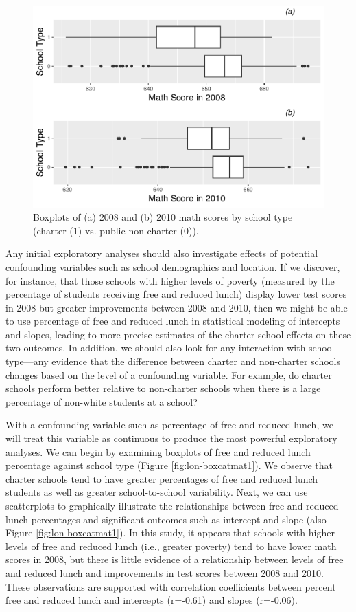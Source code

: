 \documentclass[
]{krantz}
\begin{document}
\begin{figure}

{\centering \includegraphics[width=0.6\linewidth]{bookdown-BeyondMLR_files/figure-latex/lon-box3-1} 

}

\caption{Boxplots of (a) 2008 and (b) 2010 math scores by school type (charter (1) vs. public non-charter (0)).}\label{fig:lon-box3}
\end{figure}

Any initial exploratory analyses should also investigate effects of potential confounding variables such as school demographics and location. If we discover, for instance, that those schools with higher levels of poverty (measured by the percentage of students receiving free and reduced lunch) display lower test scores in 2008 but greater improvements between 2008 and 2010, then we might be able to use percentage of free and reduced lunch in statistical modeling of intercepts and slopes, leading to more precise estimates of the charter school effects on these two outcomes. In addition, we should also look for any interaction with school type---any evidence that the difference between charter and non-charter schools changes based on the level of a confounding variable. For example, do charter schools perform better relative to non-charter schools when there is a large percentage of non-white students at a school?

With a confounding variable such as percentage of free and reduced lunch, we will treat this variable as continuous to produce the most powerful exploratory analyses. We can begin by examining boxplots of free and reduced lunch percentage against school type (Figure \ref{fig:lon-boxcatmat1}). We observe that charter schools tend to have greater percentages of free and reduced lunch students as well as greater school-to-school variability. Next, we can use scatterplots to graphically illustrate the relationships between free and reduced lunch percentages and significant outcomes such as intercept and slope (also Figure \ref{fig:lon-boxcatmat1}). In this study, it appears that schools with higher levels of free and reduced lunch (i.e., greater poverty) tend to have lower math scores in 2008, but there is little evidence of a relationship between levels of free and reduced lunch and improvements in test scores between 2008 and 2010. These observations are supported with correlation coefficients between percent free and reduced lunch and intercepts (r=-0.61) and slopes (r=-0.06).
\end{document}
